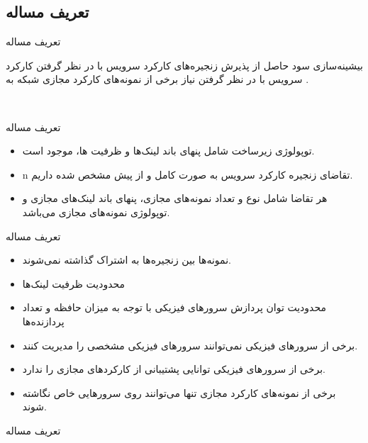 \documentclass{beamer}
\makeatletter
\newcommand{\RTList}{\raggedleft\rightskip\@totalleftmargin}
\makeatother
\begin{document}
\begin{persian}
\begin{frame}{}
    \section{تعریف مساله}
\end{frame}
\begin{frame}{تعریف مساله}
    \par
    بیشینه‌سازی سود حاصل از پذیرش زنجیره‌های کارکرد سرویس با در نظر گرفتن کارکرد سرویس با در نظر گرفتن نیاز برخی از نمونه‌های کارکرد
    مجازی شبکه به .
\end{frame}‌
\begin{frame}{تعریف مساله}
    \begin{itemize}\RTList{}
        \justifying
        \item توپولوژی زیرساخت شامل پنهای باند لینک‌ها و ظرفیت ها، موجود است.
        \item n تقاضای زنجیره‌ کارکرد سرویس به صورت کامل و از پیش مشخص شده داریم.
        \item هر تقاضا شامل نوع و تعداد نمونه‌های مجازی، پنهای باند لینک‌های مجازی و توپولوژی
        نمونه‌های مجازی می‌باشد.
    \end{itemize}
\end{frame}
\begin{frame}{تعریف مساله}
    \justifying
    \begin{itemize}\RTList{}
        \item نمونه‌ها بین زنجیره‌ها به اشتراک گذاشته نمی‌شوند.
        \item محدودیت ظرفیت لینک‌ها
        \item محدودیت توان پردازش سرورهای فیزیکی با توجه به میزان حافظه و تعداد پردازنده‌ها
        \item برخی از سرور‌های فیزیکی نمی‌توانند سرور‌های فیزیکی مشخصی را مدیریت کنند.
        \item برخی از سرورهای فیزیکی توانایی پشتیبانی از کارکردهای مجازی را ندارد.
        \item برخی از نمونه‌های کارکرد مجازی تنها می‌توانند روی سرورهایی خاص نگاشته شوند.
    \end{itemize}
\end{frame}
\begin{frame}{تعریف مساله}

\end{frame}
\end{persian}
\end{document}
